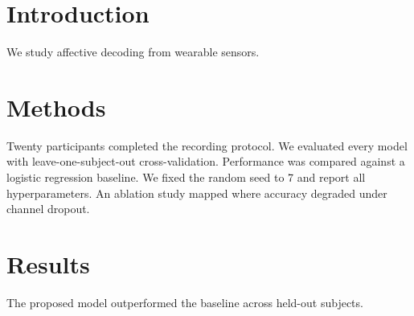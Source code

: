 \documentclass{article}
\begin{document}
\section{Introduction}
We study affective decoding from wearable sensors.
\section{Methods}
Twenty participants completed the recording protocol.
We evaluated every model with leave-one-subject-out cross-validation.
Performance was compared against a logistic regression baseline.
We fixed the random seed to 7 and report all hyperparameters.
An ablation study mapped where accuracy degraded under channel dropout.
\section{Results}
The proposed model outperformed the baseline across held-out subjects.
\end{document}
